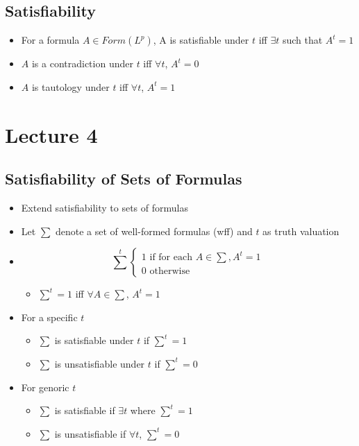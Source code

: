 \documentclass[11pt]{article}
\begin{document}
\subsection{Satisfiability}
\begin{itemize}
    \item For a formula $A\in Form(L^p)$, A is satisfiable under $t$ iff $\exists t$ such that $A^t = 1$
    \item $A$ is a contradiction under $t$ iff $\forall t$, $A^t = 0$
    \item $A$ is tautology under $t$ iff $\forall t$, $A^t = 1$
\end{itemize}

\section{Lecture 4}
\subsection{Satisfiability of Sets of Formulas}
\begin{itemize}
    \item Extend satisfiability to sets of formulas 
    \item Let $\sum$ denote a set of well-formed formulas (wff) and $t$ as truth valuation 
    \item 
    \begin{equation*}
        {\sum}^t
        \begin{cases}
            1 \text{ if for each } A\in\sum, A^t = 1 \\
            0 \text{ otherwise }
        \end{cases}
    \end{equation*}
    \begin{itemize}
        \item ${\sum}^t = 1$ iff $\forall A\in\sum$, $A^t = 1$
    \end{itemize}
    \item For a specific $t$
    \begin{itemize}
        \item $\sum$ is satisfiable under $t$ if ${\sum}^t = 1$ 
        \item $\sum$ is unsatisfiable under $t$ if ${\sum}^t = 0$
    \end{itemize}
    \item For genoric $t$
    \begin{itemize}
        \item $\sum$ is satisfiable if $\exists t$ where ${\sum}^t = 1$
        \item $\sum$ is unsatisfiable if $\forall t$, ${\sum}^t = 0$
    \end{itemize}
\end{itemize}
\end{document}
